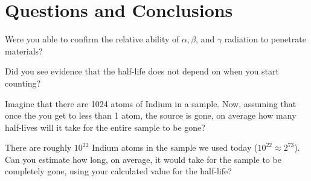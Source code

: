 \section {Questions and Conclusions}
Were you able to confirm the relative ability of $\alpha, \beta$, and $\gamma$ radiation to penetrate materials?

Did you see evidence that the half-life does not depend on when you start counting? 

Imagine that there are 1024 atoms of Indium in a sample.  Now, assuming that once the you get to less than 1 atom, the source is gone, on average how many half-lives will it take for the entire sample to be gone?

There are roughly $10^{22}$ Indium atoms in the sample we used today ($10^{22}\approx2^{73}$).  Can you estimate how long, on average, it would take for the sample to be completely gone, using your calculated value for the half-life?

\endinput